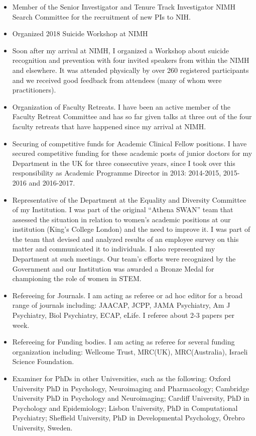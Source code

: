 \documentclass[
]{article}
\begin{document}
\begin{itemize}
\item
  Member of the Senior Investigator and Tenure Track Investigator NIMH
  Search Committee for the recruitment of new PIs to NIH.
\item
  Organized 2018 Suicide Workshop at NIMH
\item
  Soon after my arrival at NIMH, I organized a Workshop about suicide
  recognition and prevention with four invited speakers from within the
  NIMH and elsewhere. It was attended physically by over 260 registered
  participants and we received good feedback from attendees (many of
  whom were practitioners).
\item
  Organization of Faculty Retreats. I have been an active member of the
  Faculty Retreat Committee and has so far given talks at three out of
  the four faculty retreats that have happened since my arrival at NIMH.
\item
  Securing of competitive funds for Academic Clinical Fellow positions.
  I have secured competitive funding for these academic posts of junior
  doctors for my Department in the UK for three consecutive years, since
  I took over this responsibility as Academic Programme Director in
  2013: 2014-2015, 2015-2016 and 2016-2017.
\item
  Representative of the Department at the Equality and Diversity
  Committee of my Institution. I was part of the original ``Athena
  SWAN'' team that assessed the situation in relation to women's
  academic positions at our institution (King's College London) and the
  need to improve it. I was part of the team that devised and analyzed
  results of an employee survey on this matter and communicated it to
  individuals. I also represented my Department at such meetings. Our
  team's efforts were recognized by the Government and our Institution
  was awarded a Bronze Medal for championing the role of women in STEM.
\item
  Refereeing for Journals. I am acting as referee or ad hoc editor for a
  broad range of journals including: JAACAP, JCPP, JAMA Psychiatry, Am J
  Psychiatry, Biol Psychiatry, ECAP, eLife. I referee about 2-3 papers
  per week.
\item
  Refereeing for Funding bodies. I am acting as referee for several
  funding organization including: Wellcome Trust, MRC(UK),
  MRC(Australia), Israeli Science Foundation.
\item
  Examiner for PhDs in other Universities, such as the following: Oxford
  University PhD in Psychology, Neuroimaging and Pharmacology; Cambridge
  University PhD in Psychology and Neuroimaging; Cardiff University, PhD
  in Psychology and Epidemiology; Lisbon University, PhD in
  Computational Psychiatry; Sheffield University, PhD in Developmental
  Psychology, Örebro University, Sweden.
\end{itemize}
\end{document}

